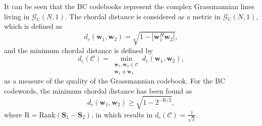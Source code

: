 \documentclass[lettersize,journal,onecolumn]{IEEEtran}
\begin{document}
\noindent It can be seen that the BC codebooks represent the complex Grassmannian lines living in $\mathcal{G}_{\mathbb{C}}\left(N,1\right)$. The chordal distance is considered as a metric in $\mathcal{G}_{\mathbb{C}}\left(N,1\right)$, which is defined as 
\begin{equation}
	d_c\left(\mathbf{w}_1, \mathbf{w}_2\right) = \sqrt{1-\left\lvert \mathbf{w}_1^H \mathbf{w}_2 \right\rvert},
\end{equation}
and the minimum chordal distance is defined by
\begin{equation}
	d_c\left(\mathcal{C}\right) = \underset{\substack{\mathbf{w}_1, \mathbf{w}_2 \in \mathcal{C} \\ \mathbf{w}_1 \neq \mathbf{w}_2  }}{\min}{d_c\left(\mathbf{w}_1, \mathbf{w}_2\right)},
\end{equation}
as a measure of the quality of the Grassmannian codebook. For the BC codewords, the minimum chordal distance has been found as
\begin{equation}
	d_c\left(\mathbf{w}_1, \mathbf{w}_2\right) \ge \sqrt{1-2^{-\text{R}/2}},
\end{equation}
where $\text{R} = \text{Rank}\left(\mathbf{S}_1 - \mathbf{S}_2\right)$, in which results in $d_c(\mathcal{C})=\frac{1}{\sqrt{2}}$.
\end{document}
